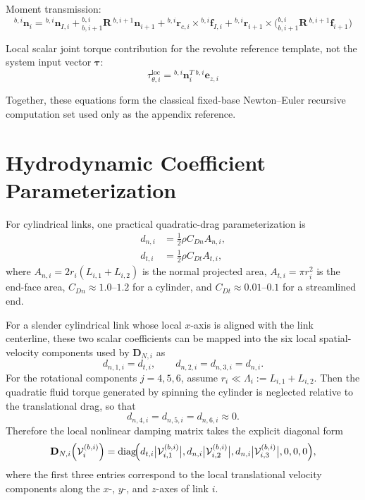 \documentclass[12pt,a4paper]{report}
\newcommand{\formulaannotation}[1]{\par\noindent{}#1\par\vspace{0.35em}}
\newcommand{\vect}[1]{\mathbf{#1}}
\newcommand{\mat}[1]{\mathbf{#1}}
\begin{document}
Moment transmission:
\begin{equation}
{}^{b,i}\vect{n}_{i}
=
{}^{b,i}\vect{n}_{I,i}
+
{}_{b,i+1}^{b,i}\mat{R}\,{}^{b,i+1}\vect{n}_{i+1}
+
{}^{b,i}\vect{r}_{c,i} \times {}^{b,i}\vect{f}_{I,i}
+
{}^{b,i}\vect{r}_{i+1}
\times
\bigl({}_{b,i+1}^{b,i}\mat{R}\,{}^{b,i+1}\vect{f}_{i+1}\bigr)
\end{equation}

Local scalar joint torque contribution for the revolute reference template, not the system input vector $\boldsymbol{\tau}$:
\begin{equation}
\tau_{\theta,i}^{\mathrm{loc}}
=
{}^{b,i}\vect{n}_{i}^{T}\,{}^{b,i}\vect{e}_{z,i}
\end{equation}
\formulaannotation{Together, these equations form the classical fixed-base Newton--Euler recursive computation set used only as the appendix reference.}

\chapter{Hydrodynamic Coefficient Parameterization}
\label{app:hydrodynamic-parameterization}

For cylindrical links, one practical quadratic-drag parameterization is
\begin{align}
d_{n,i} &= \frac{1}{2} \rho C_{Dn} A_{n,i}, \\
d_{t,i} &= \frac{1}{2} \rho C_{Dt} A_{t,i},
\end{align}
where $A_{n,i} = 2r_i(L_{i,1}+L_{i,2})$ is the normal projected area, $A_{t,i} = \pi r_i^2$ is the end-face area, $C_{Dn} \approx 1.0$--$1.2$ for a cylinder, and $C_{Dt} \approx 0.01$--$0.1$ for a streamlined end.

For a slender cylindrical link whose local $x$-axis is aligned with the link centerline, these two scalar coefficients can be mapped into the six local spatial-velocity components used by $\mathbf{D}_{N,i}$ as
\begin{equation}
d_{n,1,i} = d_{t,i},
\qquad
d_{n,2,i} = d_{n,3,i} = d_{n,i}.
\end{equation}
For the rotational components $j=4,5,6$, assume $r_i \ll \Lambda_i := L_{i,1}+L_{i,2}$. Then the quadratic fluid torque generated by spinning the cylinder is neglected relative to the translational drag, so that
\begin{equation}
d_{n,4,i} = d_{n,5,i} = d_{n,6,i} \approx 0.
\end{equation}
Therefore the local nonlinear damping matrix takes the explicit diagonal form
\begin{equation}
\mathbf{D}_{N,i}\!\left(\mathcal{V}_i^{(b,i)}\right)
=
\operatorname{diag}\!\Bigl(
d_{t,i}\bigl|\mathcal{V}_{i,1}^{(b,i)}\bigr|,
d_{n,i}\bigl|\mathcal{V}_{i,2}^{(b,i)}\bigr|,
d_{n,i}\bigl|\mathcal{V}_{i,3}^{(b,i)}\bigr|,
0,
0,
0
\Bigr),
\end{equation}
where the first three entries correspond to the local translational velocity components along the $x$-, $y$-, and $z$-axes of link $i$.
\end{document}
